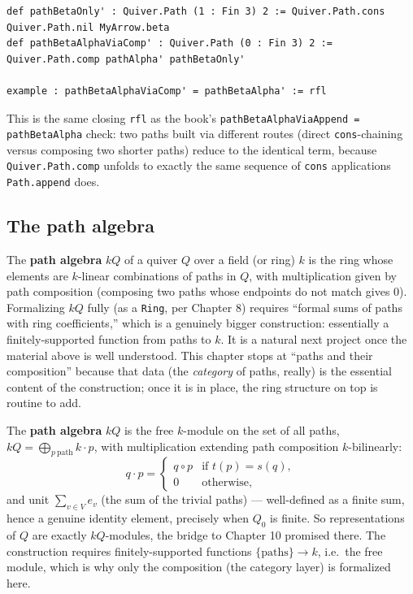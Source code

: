 \begin{lstlisting}
def pathBetaOnly' : Quiver.Path (1 : Fin 3) 2 := Quiver.Path.cons Quiver.Path.nil MyArrow.beta
def pathBetaAlphaViaComp' : Quiver.Path (0 : Fin 3) 2 := Quiver.Path.comp pathAlpha' pathBetaOnly'

example : pathBetaAlphaViaComp' = pathBetaAlpha' := rfl
\end{lstlisting}

This is the same closing \texttt{rfl} as the book's \texttt{pathBetaAlphaViaAppend = pathBetaAlpha} check: two paths built via different routes (direct \texttt{cons}-chaining versus composing two shorter paths) reduce to the identical term, because \texttt{Quiver.Path.comp} unfolds to exactly the same sequence of \texttt{cons} applications \texttt{Path.append} does.

\subsection{The path algebra}\label{sec:11-path-algebras:05-path-composition:4}

The \textbf{path algebra} \(kQ\) of a quiver \(Q\) over a field (or ring) \(k\) is the ring whose elements are \(k\)-linear combinations of paths in \(Q\), with multiplication given by path composition (composing two paths whose endpoints do not match gives \(0\)). Formalizing \(kQ\) fully (as a \texttt{Ring}, per Chapter 8) requires ``formal sums of paths with ring coefficients,'' which is a genuinely bigger construction: essentially a finitely-supported function from paths to \(k\). It is a natural next project once the material above is well understood. This chapter stops at ``paths and their composition'' because that data (the \emph{category} of paths, really) is the essential content of the construction; once it is in place, the ring structure on top is routine to add.

\begin{mathreading}

The \textbf{path algebra} \(kQ\) is the free \(k\)-module on the set of all paths, \(kQ = \bigoplus_{p\ \text{path}} k\cdot p\), with multiplication extending path composition \(k\)-bilinearly: \[
q \cdot p = \begin{cases} q\circ p & \text{if } t(p) = s(q),\\ 0 &
\text{otherwise,}\end{cases}
\] and unit \(\sum_{v\in V} e_v\) (the sum of the trivial paths) --- well-defined as a finite sum, hence a genuine identity element, precisely when \(Q_0\) is finite. So representations of \(Q\) are exactly \(kQ\)-modules, the bridge to Chapter 10 promised there. The construction requires finitely-supported functions \(\{\text{paths}\} \to k\), i.e.~the free module, which is why only the composition (the category layer) is formalized here.

\end{mathreading}

